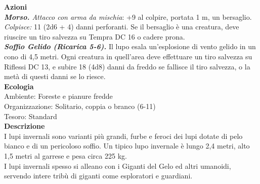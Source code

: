\begin{multicols}{2}
\smallskip\textbf{Azioni}\\
\emph{\textbf{Morso.} Attacco con arma da mischia}: +9 al colpire, portata 1 m, un bersaglio.\\
\emph{Colpisce:} 11 (2d6 + 4) danni perforanti. Se il bersaglio è una creatura, deve riuscire un tiro salvezza su Tempra DC  16 o cadere prona.\\
\emph{\textbf{Soffio Gelido (Ricarica 5-6).}} Il lupo esala un'esplosione di vento gelido in un cono di 4,5 metri. Ogni creatura in quell'area deve effettuare un tiro salvezza su Riflessi DC  13, e subire 18 (4d8) danni da freddo se fallisce il tiro salvezza, o la metà di questi danni se lo riesce. \\
\textbf{Ecologia}\\
Ambiente: Foreste e pianure fredde\\
Organizzazione: Solitario, coppia o branco (6-11)\\
Tesoro: Standard\\
\textbf{Descrizione}\\
I lupi invernali sono varianti più grandi, furbe e feroci dei lupi dotate di pelo bianco e di un pericoloso soffio. Un tipico lupo invernale è lungo 2,4 metri, alto 1,5 metri al garrese e pesa circa 225 kg.\\
I lupi invernali spesso si alleano con i Giganti del Gelo ed altri umanoidi, servendo intere tribù di giganti come esploratori e guardiani.\\


\end{multicols}
